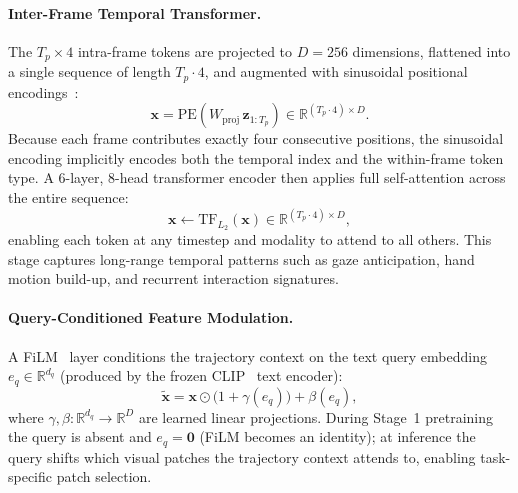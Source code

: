 \paragraph{Inter-Frame Temporal Transformer.}
The $T_p \times 4$ intra-frame tokens are projected to $D{=}256$ dimensions,
flattened into a single sequence of length $T_p \cdot 4$, and augmented with
sinusoidal positional encodings~\cite{vaswani2017attention}:
\begin{equation}
    \mathbf{x} = \mathrm{PE}\!\left(
        W_{\mathrm{proj}}\,\mathbf{z}_{1:T_p}
    \right) \in \mathbb{R}^{(T_p \cdot 4) \times D}.
\end{equation}
Because each frame contributes exactly four consecutive positions, the sinusoidal
encoding implicitly encodes both the temporal index and the within-frame token type.
A 6-layer, 8-head transformer encoder then applies full self-attention across the
entire sequence:
\begin{equation}
    \mathbf{x} \leftarrow \mathrm{TF}_{L_2}(\mathbf{x})
    \in \mathbb{R}^{(T_p \cdot 4) \times D},
\end{equation}
enabling each token at any timestep and modality to attend to all others.
This stage captures long-range temporal patterns such as gaze anticipation,
hand motion build-up, and recurrent interaction signatures.

\paragraph{Query-Conditioned Feature Modulation.}
A FiLM~\cite{perez2018film} layer conditions the trajectory context on the
text query embedding $e_q \in \mathbb{R}^{d_q}$
(produced by the frozen CLIP~\cite{radford2021clip} text encoder):
\begin{equation}
    \tilde{\mathbf{x}} = \mathbf{x} \odot \bigl(1 + \gamma(e_q)\bigr) + \beta(e_q),
\end{equation}
where $\gamma, \beta : \mathbb{R}^{d_q} \to \mathbb{R}^D$ are learned linear projections.
During Stage~1 pretraining the query is absent and $e_q{=}\mathbf{0}$ (FiLM becomes
an identity); at inference the query shifts which visual patches the trajectory
context attends to, enabling task-specific patch selection.

